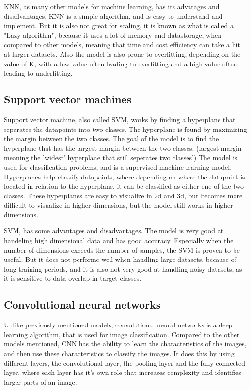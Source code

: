 KNN, as many other models for machine learning, has its advatages and disadvantages. KNN is a simple algorithm, and is easy to understand and implement. But it is also not great for scaling, it is known as what is called a "Lazy algorithm", because it uses a lot of memory and datastorage, when compared to other models, meaning that time and cost efficiency can take a hit at larger datasets\cite{K-NearestNeighborsIBM}. Also the model is also prone to overfitting, depending on the value of K, with a low value often leading to overfitting and a high value often leading to underfitting. 

\subsection{Support vector machines}
Support vector machine, also called SVM, works by finding a hyperplane that separates the datapoints into two classes\cite{SupportVectorMachines}. The hyperplane is found by maximizing the margin between the two classes. The goal of the model is to find the hyperplane that has the largest margin between the two classes. (largest margin meaning the 'widest' hyperplane that still seperates two classes') The model is used for classification problems, and is a supervised machine learning model. Hyperplanes help classify datapoints, where depending on where the datapoint is located in relation to the hyperplane, it can be classified as either one of the two classes. These hyperplanes are easy to visualize in 2d and 3d, but becomes more difficult to visualize in higher dimensions, but the model still works in higher dimensions.

SVM, has some advantages and disadvantages. The model is very good at handeling high dimensional data and has good accuracy\cite{SVMProsAndCons}. Especially when the number of dimensions exceeds the number of samples, the SVM is proven to be useful.
But it does not performe well when handling large datasets, because of long training periods, and it is also not very good at handling noisy datasets, as it is sensitive to data overlap in target classes.


\subsection{Convolutional neural networks}
Unlike previously mentioned models, convolutional neural networks is a deep learning algorithm, that is used for image classification. Compared to the other models mentioned, CNN has the ability to learn the characteristics of the images, and then use these characteristics to classify the images\cite{CNNIBM}. It does this by using different layers, the convolutional layer, the pooling layer and the fully connected layer, where each layer has it's own role that increases complexity and identifies larger parts of an image. 

